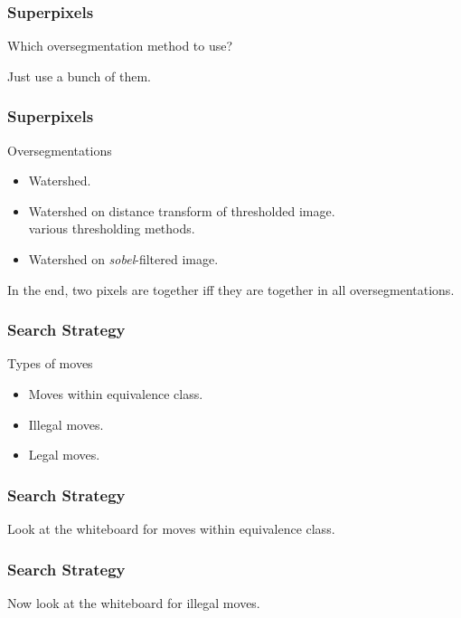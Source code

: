 \documentclass{beamer}
\begin{document}
\begin{frame}[fragile]
\frametitle{Superpixels}

Which oversegmentation method to use?
\pause
\bigskip

Just use a bunch of them.
\end{frame}

\begin{frame}[fragile]
\frametitle{Superpixels}

\begin{block}{Oversegmentations}
\begin{itemize}
\item Watershed.
\item Watershed on distance transform of thresholded image.\\
\hspace{4em} various thresholding methods.
\item Watershed on \textit{sobel\/}-filtered image.
\end{itemize}
\end{block}

\pause
In the end, \alert{two pixels are together iff they are together in all oversegmentations.}

\end{frame}

\begin{frame}[fragile]
\frametitle{Search Strategy}

\begin{block}{Types of moves}
\begin{itemize}
\item Moves within equivalence class.
\item Illegal moves.
\item Legal moves.
\end{itemize}
\end{block}

\end{frame}

\begin{frame}[fragile]
\frametitle{Search Strategy}

Look at the whiteboard for moves within equivalence class.

\end{frame}

\begin{frame}[fragile]
\frametitle{Search Strategy}

Now look at the whiteboard for illegal moves.

\end{frame}
\end{document}
